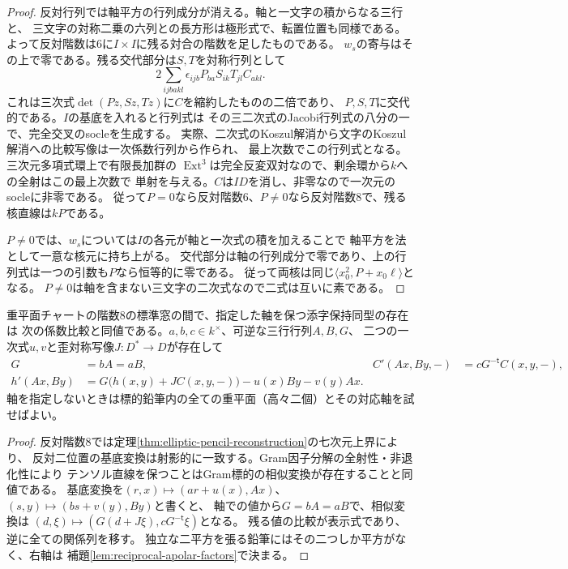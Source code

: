 \begin{proof}
反対行列では軸平方の行列成分が消える。軸と一文字の積からなる三行と、
三文字の対称二乗の六列との長方形は極形式で、転置位置も同様である。
よって反対階数は6に$I\times I$に残る対合の階数を足したものである。
$w_s$の寄与はその上で零である。残る交代部分は$S,T$を対称行列として
\[
 2\sum_{ijb a k l}\epsilon_{ijb}P_{ba}S_{ik}T_{jl}C_{akl}.
\]
これは三次式$\det(Pz,Sz,Tz)$に$C$を縮約したものの二倍であり、
$P,S,T$に交代的である。$I$の基底を入れると行列式は
その三二次式のJacobi行列式の八分の一で、完全交叉のsocleを生成する。
実際、二次式のKoszul解消から文字のKoszul解消への比較写像は一次係数行列から作られ、
最上次数でこの行列式となる。三次元多項式環上で有限長加群の
$\operatorname{Ext}^3$は完全反変双対なので、剰余環から$k$への全射はこの最上次数で
単射を与える。$C$は$I D$を消し、非零なので一次元のsocleに非零である。
従って$P=0$なら反対階数6、$P\ne0$なら反対階数8で、残る核直線は$kP$である。

$P\ne0$では、$w_s$については$I$の各元が軸と一次式の積を加えることで
軸平方を法として一意な核元に持ち上がる。
交代部分は軸の行列成分で零であり、上の行列式は一つの引数も$P$なら恒等的に零である。
従って両核は同じ$\langle x_0^2,P+x_0\ell\rangle$となる。
$P\ne0$は軸を含まない三文字の二次式なので二式は互いに素である。
\end{proof}

\begin{corollary}[階数8の順序付き同型判定]\label{cor:double-plane-isom}
重平面チャートの階数8の標準窓の間で、指定した軸を保つ添字保持同型の存在は
次の係数比較と同値である。$a,b,c\in k^\times$、可逆な三行行列$A,B,G$、
二つの一次式$u,v$と歪対称写像$J:D^*\to D$が存在して
\[
\begin{aligned}
 G&=bA=aB, & C'(Ax,By,-)&=cG^{-\mathsf t}C(x,y,-),\\
 h'(Ax,By)&=G\big(h(x,y)+JC(x,y,-)\big)-u(x)By-v(y)Ax .
\end{aligned}
\]
軸を指定しないときは標的鉛筆内の全ての重平面（高々二個）とその対応軸を試せばよい。
\end{corollary}
\begin{proof}
反対階数8では定理\ref{thm:elliptic-pencil-reconstruction}の七次元上界により、
反対二位置の基底変換は射影的に一致する。Gram因子分解の全射性・非退化性により
テンソル直線を保つことはGram標的の相似変換が存在することと同値である。
基底変換を$(r,x)\mapsto (ar+u(x),Ax)$、$(s,y)\mapsto(bs+v(y),By)$と書くと、
軸での値から$G=bA=aB$で、相似変換は
$(d,\xi)\mapsto(G(d+J\xi),cG^{-\mathsf t}\xi)$となる。
残る値の比較が表示式であり、逆に全ての関係列を移す。
独立な二平方を張る鉛筆にはその二つしか平方がなく、右軸は
補題\ref{lem:reciprocal-apolar-factors}で決まる。
\end{proof}

